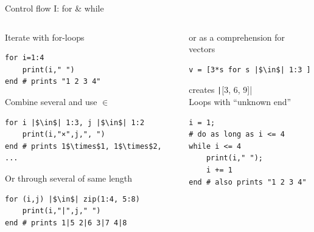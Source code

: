 \documentclass[aspectratio=169, 11pt, handout]{beamer}
\begin{document}
    \begin{frame}[fragile]{Control flow I: for \& while}
        \begin{columns}[T]
            \begin{column}{.5\textwidth}
                \alert{Iterate} with for-loops
                \begin{verbatim}
for i=1:4
    print(i," ")
end # prints "1 2 3 4"
                \end{verbatim}
                \vspace{\baselineskip}
                \pause
                Combine several and use $\in$
                \begin{verbatim}
for i |$\in$| 1:3, j |$\in$| 1:2
    print(i,"×",j,", ")
end # prints 1$\times$1, 1$\times$2, ...
                \end{verbatim}
                \vspace{\baselineskip}
                \pause
                Or through several of same length
                \begin{verbatim}
for (i,j) |$\in$| zip(1:4, 5:8)
    print(i,"|",j," ")
end # prints 1|5 2|6 3|7 4|8
                \end{verbatim}
            \end{column}
            \pause
            \begin{column}{.5\textwidth}
                or as a \alert{comprehension} for vectors
                \begin{verbatim}
v = [3*s for s |$\in$| 1:3 ]
                \end{verbatim}
                creates \texttt|[3, 6, 9]|
                \\[2.5\baselineskip]
                \pause
                Loops with “unknown end”
                \begin{verbatim}
i = 1;
# do as long as i <= 4
while i <= 4
    print(i," ");
    i += 1
end # also prints "1 2 3 4"
                \end{verbatim}
            \end{column}
        \end{columns}
    \end{frame}
\end{document}
